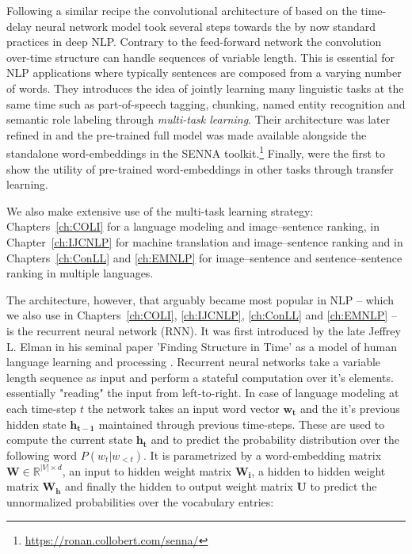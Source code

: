 Following a similar recipe the convolutional architecture of \cite{collobert2008unified}
based on the time-delay neural network model \citep{waibel1990phoneme} took several steps towards the
by now standard practices in deep NLP.
Contrary to the feed-forward network the convolution over-time structure can handle
sequences of variable length. This is essential for NLP applications where typically sentences
are composed from a varying number of words.
They introduces the idea of jointly learning many linguistic tasks at the same time such as part-of-speech
tagging, chunking, named entity recognition and semantic role labeling through \emph{multi-task learning}.
Their architecture was later refined in \cite{collobert2011natural} and the pre-trained
full model was made available alongside the standalone word-embeddings in the SENNA toolkit.\footnote{\url{https://ronan.collobert.com/senna/}}
Finally, \cite{collobert2008unified} were the first to show the utility of pre-trained word-embeddings
in other tasks through transfer learning.

We also make extensive use of the multi-task learning strategy:  Chapters~\ref{ch:COLI} for
a language modeling and image--sentence ranking, in Chapter~\ref{ch:IJCNLP} for machine translation
and image--sentence ranking and in Chapters~\ref{ch:ConLL} and \ref{ch:EMNLP} for image--sentence
and sentence--sentence ranking in multiple languages.


The architecture, however, that arguably became most popular in NLP -- which we also use in
Chapters~\ref{ch:COLI}, \ref{ch:IJCNLP}, \ref{ch:ConLL} and \ref{ch:EMNLP} --
is the recurrent neural network (RNN). It was
first introduced by the late Jeffrey L. Elman in his seminal paper  'Finding Structure in Time'
as a model of human language learning and processing \citep{elman1990finding}. Recurrent neural networks
take a variable length sequence as input and perform a stateful computation over it's elements.
essentially "reading" the input from left-to-right.
In case of language modeling at each time-step $t$ the network takes an input word vector $\mathbf{w_t}$
and the it's previous hidden state $\mathbf{h_{t-1}}$ maintained through previous
time-steps. These are used to compute the current
state $\mathbf{h_t}$ and to predict the probability distribution over the following word $P(w_t|w_{<t})$.
It is parametrized by a word-embedding matrix $\mathbf{W} \in \mathbb{R}^{|V| \times d}$,
an input to hidden weight matrix $\mathbf{W_i}$, a hidden to hidden weight
matrix $\mathbf{W_h}$ and finally the hidden to output
weight matrix $\mathbf{U}$ to predict the unnormalized probabilities over the vocabulary entries:

